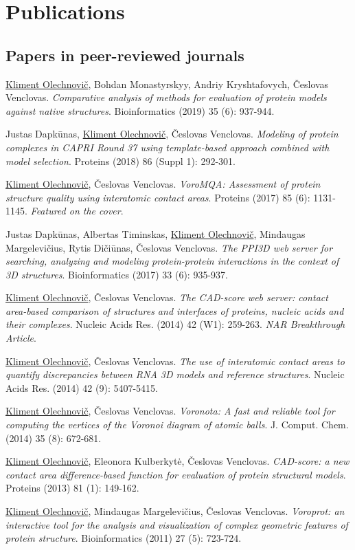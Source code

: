 \documentclass{article}
\newenvironment{enumerate_tight}{
\begin{enumerate}
  \setlength{\itemsep}{2pt}
  \setlength{\parskip}{0pt}
  \setlength{\parsep}{0pt}
}{\end{enumerate}}
\begin{document}
\section*{Publications}

\subsection*{Papers in peer-reviewed journals}
\begin{enumerate_tight}
  \item \underline{Kliment Olechnovič}, Bohdan Monastyrskyy, Andriy Kryshtafovych, Česlovas Venclovas.
        \emph{Comparative analysis of methods for evaluation of protein models against native structures}.
        Bioinformatics (2019) 35 (6): 937-944.
  \item Justas Dapkūnas, \underline{Kliment Olechnovič}, Česlovas Venclovas.
        \emph{Modeling of protein complexes in CAPRI Round 37 using template-based approach combined with model selection}.
        Proteins (2018) 86 (Suppl 1): 292-301.
  \item \underline{Kliment Olechnovič}, Česlovas Venclovas.
        \emph{VoroMQA: Assessment of protein structure quality using interatomic contact areas}.
        Proteins (2017) 85 (6): 1131-1145. \emph{Featured on the cover}.
  \item Justas Dapkūnas, Albertas Timinskas, \underline{Kliment Olechnovič}, Mindaugas Margelevičius, Rytis Dičiūnas, Česlovas Venclovas.
        \emph{The PPI3D web server for searching, analyzing and modeling protein-protein interactions in the context of 3D structures}.
        Bioinformatics (2017) 33 (6): 935-937.
  \item \underline{Kliment Olechnovič}, Česlovas Venclovas.
        \emph{The CAD-score web server: contact area-based comparison of structures and interfaces of proteins, nucleic acids and their complexes}.
        Nucleic Acids Res. (2014) 42 (W1): 259-263. \emph{NAR Breakthrough Article}.
  \item \underline{Kliment Olechnovič}, Česlovas Venclovas.
        \emph{The use of interatomic contact areas to quantify discrepancies between RNA 3D models and reference structures}.
        Nucleic Acids Res. (2014) 42 (9): 5407-5415.
  \item \underline{Kliment Olechnovič}, Česlovas Venclovas.
        \emph{Voronota: A fast and reliable tool for computing the vertices of the Voronoi diagram of atomic balls}.
        J. Comput. Chem. (2014) 35 (8): 672-681.
  \item \underline{Kliment Olechnovič}, Eleonora Kulberkytė, Česlovas Venclovas.
        \emph{CAD-score: a new contact area difference-based function for evaluation of protein structural models}.
        Proteins (2013) 81 (1): 149-162.
  \item \underline{Kliment Olechnovič}, Mindaugas Margelevičius, Česlovas Venclovas.
        \emph{Voroprot: an interactive tool for the analysis and visualization of complex geometric features of protein structure}.
        Bioinformatics (2011) 27 (5): 723-724.
\end{enumerate_tight}
\end{document}
